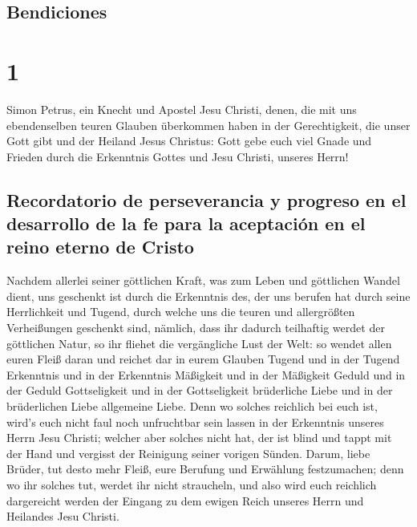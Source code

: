 \hypertarget{bendiciones}{%
\subsection{Bendiciones}\label{bendiciones}}

\hypertarget{section}{%
\section{1}\label{section}}

 Simon Petrus, ein Knecht und Apostel Jesu Christi, denen,
die mit uns ebendenselben teuren Glauben überkommen haben in der
Gerechtigkeit, die unser Gott gibt und der Heiland Jesus Christus:
 Gott gebe euch viel Gnade und Frieden durch die
Erkenntnis Gottes und Jesu Christi, unseres Herrn!

\hypertarget{recordatorio-de-perseverancia-y-progreso-en-el-desarrollo-de-la-fe-para-la-aceptaciuxf3n-en-el-reino-eterno-de-cristo}{%
\subsection{Recordatorio de perseverancia y progreso en el desarrollo de
la fe para la aceptación en el reino eterno de
Cristo}\label{recordatorio-de-perseverancia-y-progreso-en-el-desarrollo-de-la-fe-para-la-aceptaciuxf3n-en-el-reino-eterno-de-cristo}}

 Nachdem allerlei seiner göttlichen Kraft, was zum Leben
und göttlichen Wandel dient, uns geschenkt ist durch die Erkenntnis des,
der uns berufen hat durch seine Herrlichkeit und Tugend, 
durch welche uns die teuren und allergrößten Verheißungen geschenkt
sind, nämlich, dass ihr dadurch teilhaftig werdet der göttlichen Natur,
so ihr fliehet die vergängliche Lust der Welt:  so wendet
allen euren Fleiß daran und reichet dar in eurem Glauben Tugend und in
der Tugend Erkenntnis  und in der Erkenntnis Mäßigkeit und
in der Mäßigkeit Geduld und in der Geduld Gottseligkeit 
und in der Gottseligkeit brüderliche Liebe und in der brüderlichen Liebe
allgemeine Liebe.  Denn wo solches reichlich bei euch ist,
wird's euch nicht faul noch unfruchtbar sein lassen in der Erkenntnis
unseres Herrn Jesu Christi;  welcher aber solches nicht
hat, der ist blind und tappt mit der Hand und vergisst der Reinigung
seiner vorigen Sünden.  Darum, liebe Brüder, tut desto
mehr Fleiß, eure Berufung und Erwählung festzumachen; denn wo ihr
solches tut, werdet ihr nicht straucheln,  und also wird
euch reichlich dargereicht werden der Eingang zu dem ewigen Reich
unseres Herrn und Heilandes Jesu Christi.

